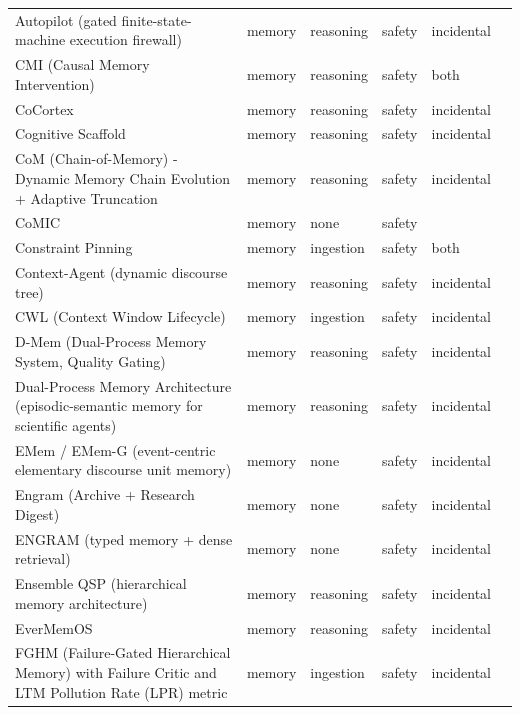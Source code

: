 \begin{longtable}{@{}p{}lllll@{}}
Autopilot (gated finite-state-machine execution firewall) & memory & reasoning & safety & incidental & \cite{deng-2026-goalautopilot} \\
CMI (Causal Memory Intervention) & memory & reasoning & safety & both & \cite{srivastava-2026-causal} \\
CoCortex & memory & reasoning & safety & incidental & \cite{kaviyaraj-2026-cocortex} \\
Cognitive Scaffold & memory & reasoning & safety & incidental & \cite{ai-2026-cognitive} \\
CoM (Chain-of-Memory) - Dynamic Memory Chain Evolution + Adaptive Truncation & memory & reasoning & safety & incidental & \cite{xu-2026-chainofmemory} \\
CoMIC & memory & none & safety &  & \cite{wang-2026-comic} \\
Constraint Pinning & memory & ingestion & safety & both & \cite{chen-2026-governance} \\
Context-Agent (dynamic discourse tree) & memory & reasoning & safety & incidental & \cite{hu-2026-contextagent} \\
CWL (Context Window Lifecycle) & memory & ingestion & safety & incidental & \cite{semenov-2026-compaction} \\
D-Mem (Dual-Process Memory System, Quality Gating) & memory & reasoning & safety & incidental & \cite{you-2026-dmem} \\
Dual-Process Memory Architecture (episodic-semantic memory for scientific agents) & memory & reasoning & safety & incidental & \cite{milosevic-2026-episodicsemantic} \\
EMem / EMem-G (event-centric elementary discourse unit memory) & memory & none & safety & incidental & \cite{zhou-2025-simple} \\
Engram (Archive + Research Digest) & memory & none & safety & incidental & \cite{karimi-2026-improving} \\
ENGRAM (typed memory + dense retrieval) & memory & none & safety & incidental & \cite{patel-2025-engram} \\
Ensemble QSP (hierarchical memory architecture) & memory & reasoning & safety & incidental & \cite{tewari-2026-hierarchical} \\
EverMemOS & memory & reasoning & safety & incidental & \cite{hu-2026-evermemos} \\
FGHM (Failure-Gated Hierarchical Memory) with Failure Critic and LTM Pollution Rate (LPR) metric & memory & ingestion & safety & incidental & \cite{liu-2026-failuregated} \\

\end{longtable}
